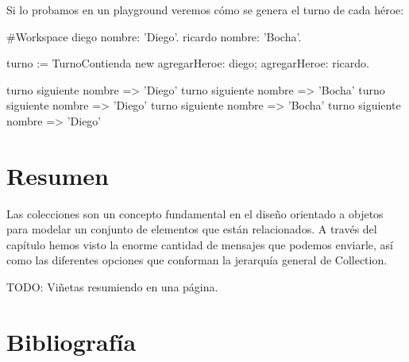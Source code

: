 \documentclass[a4paper,12pt]{book}
\begin{document}
{Si lo probamos en un playground veremos cómo se genera el turno de cada héroe:

\begin{code}
#Workspace
diego nombre: 'Diego'.
ricardo nombre: 'Bocha'.

turno := TurnoContienda new 
   agregarHeroe: diego;
   agregarHeroe: ricardo.

turno siguiente nombre => 'Diego'
turno siguiente nombre => 'Bocha'
turno siguiente nombre => 'Diego'
turno siguiente nombre => 'Bocha'
turno siguiente nombre => 'Diego'
\end{code}

\section{Resumen}
Las colecciones son un concepto fundamental en el diseño orientado a objetos para modelar un conjunto
de elementos que están relacionados. A través del capítulo hemos visto la enorme cantidad de mensajes 
que podemos enviarle, así como las diferentes opciones que conforman la jerarquía general de Collection.

TODO: Viñetas resumiendo en una página.

\section{Bibliografía}

}
\end{document}

